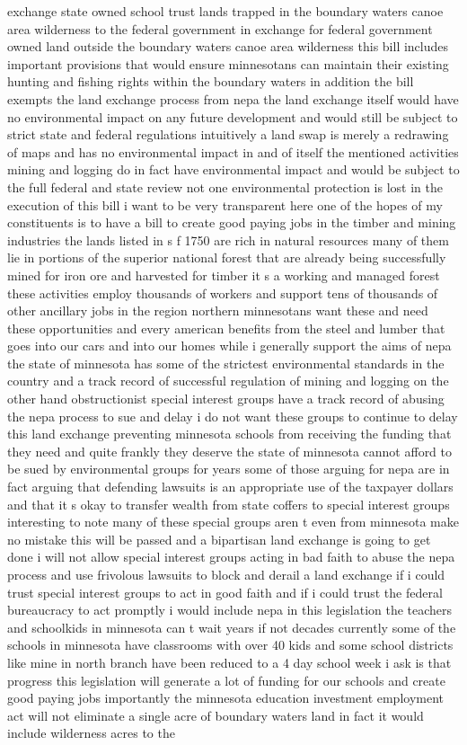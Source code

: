 \documentclass{article}
\begin{document}
exchange state owned school trust lands trapped in the boundary waters canoe area wilderness to the federal government in exchange for federal government owned land outside the boundary waters canoe area wilderness this bill includes important provisions that would ensure minnesotans can maintain their existing hunting and fishing rights within the boundary waters in addition the bill exempts the land exchange process from nepa the land exchange itself would have no environmental impact on any future development and would still be subject to strict state and federal regulations intuitively a land swap is merely a redrawing of maps and has no environmental impact in and of itself the mentioned activities mining and logging do in fact have environmental impact and would be subject to the full federal and state review not one environmental protection is lost in the execution of this bill i want to be very transparent here one of the hopes of my constituents is to have a bill to create good paying jobs in the timber and mining industries the lands listed in s f 1750 are rich in natural resources many of them lie in portions of the superior national forest that are already being successfully mined for iron ore and harvested for timber it s a working and managed forest these activities employ thousands of workers and support tens of thousands of other ancillary jobs in the region northern minnesotans want these and need these opportunities and every american benefits from the steel and lumber that goes into our cars and into our homes while i generally support the aims of nepa the state of minnesota has some of the strictest environmental standards in the country and a track record of successful regulation of mining and logging on the other hand obstructionist special interest groups have a track record of abusing the nepa process to sue and delay i do not want these groups to continue to delay this land exchange preventing minnesota schools from receiving the funding that they need and quite frankly they deserve the state of minnesota cannot afford to be sued by environmental groups for years some of those arguing for nepa are in fact arguing that defending lawsuits is an appropriate use of the taxpayer dollars and that it s okay to transfer wealth from state coffers to special interest groups interesting to note many of these special groups aren t even from minnesota make no mistake this will be passed and a bipartisan land exchange is going to get done i will not allow special interest groups acting in bad faith to abuse the nepa process and use frivolous lawsuits to block and derail a land exchange if i could trust special interest groups to act in good faith and if i could trust the federal bureaucracy to act promptly i would include nepa in this legislation the teachers and schoolkids in minnesota can t wait years if not decades currently some of the schools in minnesota have classrooms with over 40 kids and some school districts like mine in north branch have been reduced to a 4 day school week i ask is that progress this legislation will generate a lot of funding for our schools and create good paying jobs importantly the minnesota education investment employment act will not eliminate a single acre of boundary waters land in fact it would include wilderness acres to the 
\end{document}
